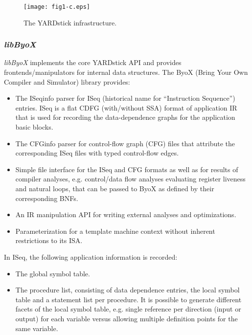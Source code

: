 \documentclass{comjnl}
\begin{document}
\begin{figure}[tb]
  \centering
  \texttt{[image: fig1-c.eps]}
  \caption{The YARDstick infrastructure.}
  \label{Fig:1}
  \vspace{-0.25cm}
\end{figure}

\subsubsection{{\it libByoX}}
\label{Sec:libbyox}
{\it libByoX} implements the core YARDstick API and provides frontends/manipulators for internal data structures. 
The ByoX (Bring Your Own Compiler and Simulator) library provides:
\begin{itemize}
\item {The ISeqinfo parser for ISeq (historical name for ``Instruction Sequence'') entries. ISeq is a flat CDFG (with/without SSA) format of application IR that is used for recording the data-dependence graphs for the application basic blocks.}
\item {The CFGinfo parser for control-flow graph (CFG) files that attribute the corresponding ISeq files with typed control-flow edges.}
\item {Simple file interface for the ISeq and CFG formats as well as for results of compiler analyses, e.g. control/data flow analyses evaluating register liveness and natural loops, that can be passed to ByoX as defined by their corresponding BNFs.}
\item {An IR manipulation API for writing external analyses and optimizations.}
\item {Parameterization for a template machine context without inherent restrictions to its ISA.}
\end{itemize}

In ISeq, the following application information is recorded:
\begin{itemize}
\item	{The global symbol table.}
\item {The procedure list, consisting of data dependence entries, the local symbol table and a statement list per procedure. It is possible to generate different facets of the local symbol table, e.g. single reference per direction (input or output) for each variable versus allowing multiple definition points for the same variable.}
\end{itemize}
\end{document}
